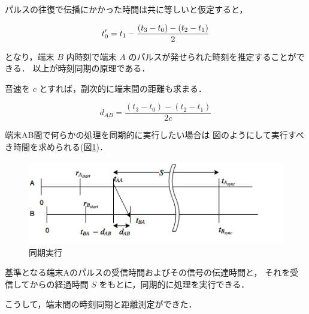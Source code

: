 パルスの往復で伝播にかかった時間は共に等しいと仮定すると，

$$
t_0' = t_1 - \frac{(t_3 - t_0) - (t_2 - t_1)}{2} \\
$$

となり，端末 $B$ 内時刻で端末 $A$ のパルスが発せられた時刻を推定することができる．
以上が時刻同期の原理である．

音速を $c$ とすれば，副次的に端末間の距離も求まる．

$$
d_{AB} = \frac{(t_3 - t_0) - (t_2 - t_1)}{2c}
$$

端末AB間で何らかの処理を同期的に実行したい場合は
図のようにして実行すべき時間を求められる(図\ref{fig:flowchart3})．

\begin{figure}[p]\centering
  \hspace{-2mm}\includegraphics[clip,width=1.1\hsize]{img/flowchart3.png}
  \caption{同期実行}\label{fig:flowchart3}
\end{figure}

基準となる端末Aのパルスの受信時間およびその信号の伝達時間と，
それを受信してからの経過時間 $S$ をもとに，同期的に処理を実行できる．

こうして，端末間の時刻同期と距離測定ができた．
